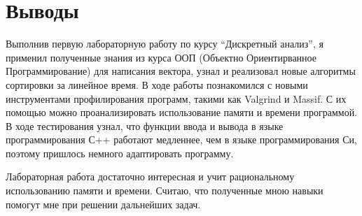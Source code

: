 \section{Выводы}

Выполнив первую лабораторную работу по курсу \enquote{Дискретный анализ},
я применил полученные знания из курса ООП (Объектно Ориентирванное Программирование) для написания вектора,
узнал и реализовал новые алгоритмы сортировки за линейное время. В ходе работы познакомился с новыми инструментами 
профилирования программ, такими как Valgrind и Massif. С их помощью можно проанализировать использование 
памяти и времени программой. В ходе тестирования узнал, что функции ввода и вывода в языке программирования С++
работают медленнее, чем в языке программирования Си, поэтому пришлось немного адаптировать программу.

Лабораторная работа достаточно интересная и учит рациональному использованию памяти и времени. Считаю, что полученные мною навыки 
помогут мне при решении дальнейших задач.
\pagebreak